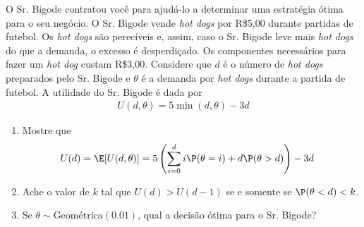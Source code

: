 \begin{exercise}
 O Sr. Bigode contratou você para ajudá-lo a determinar 
 uma estratégia ótima para o seu negócio.
 O Sr. Bigode vende \emph{hot dogs} por 
 R\$5,00 durante partidas de futebol.
 Os \emph{hot dogs} são perecíveis e, assim,
 caso o Sr. Bigode leve 
 mais \emph{hot dogs} do que a demanda,
 o excesso é desperdiçado.
 Os componentes necessários para fazer 
 um \emph{hot dog} custam R\$3,00.
 Considere que $d$ é o número de \emph{hot dogs} 
 preparados pelo Sr. Bigode e 
 $\theta$ é a demanda por \emph{hot dogs} 
 durante a partida de futebol.
 A utilidade do Sr. Bigode é dada por 
 \begin{align*}
  U(d,\theta) = 5\min(d,\theta) -3d
 \end{align*}
 \begin{enumerate}[label=(\alph*)]
  \item Mostre que
  \begin{align*}
   U(d) 
   &= \E[U(d,\theta)] = 5\left(\sum_{i=0}^{d}{i\P(\theta=i)}
   +d\P(\theta > d)\right) -3d
  \end{align*}
  \item Ache o valor de $k$ tal que 
  $U(d) > U(d-1)$ se e somente se $\P(\theta < d) < k$.
  \item Se $\theta \sim \text{Geométrica}(0.01)$, 
  qual a decisão ótima para o Sr. Bigode?
 \end{enumerate}
\end{exercise}

